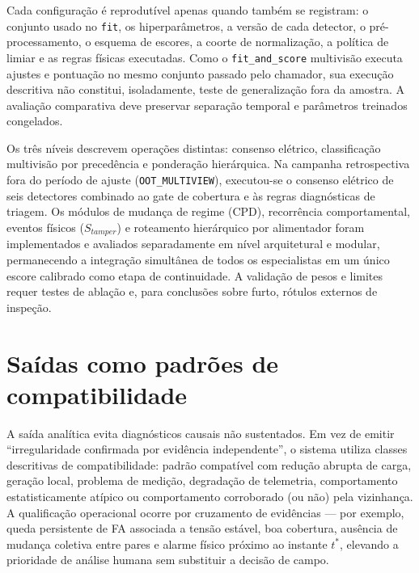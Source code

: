 Cada configuração é reprodutível apenas quando também se registram: o conjunto usado no \texttt{fit}, os hiperparâmetros, a versão de cada detector, o pré-processamento, o esquema de escores, a coorte de normalização, a política de limiar e as regras físicas executadas. Como o \texttt{fit\_and\_score} multivisão executa ajustes e pontuação no mesmo conjunto passado pelo chamador, sua execução descritiva não constitui, isoladamente, teste de generalização fora da amostra. A avaliação comparativa deve preservar separação temporal e parâmetros treinados congelados.

Os três níveis descrevem operações distintas: consenso elétrico, classificação multivisão por precedência e ponderação hierárquica. Na campanha retrospectiva fora do período de ajuste (\texttt{OOT\_MULTIVIEW}), executou-se o consenso elétrico de seis detectores combinado ao gate de cobertura e às regras diagnósticas de triagem. Os módulos de mudança de regime (CPD), recorrência comportamental, eventos físicos (\(S_{tamper}\)) e roteamento hierárquico por alimentador foram implementados e avaliados separadamente em nível arquitetural e modular, permanecendo a integração simultânea de todos os especialistas em um único escore calibrado como etapa de continuidade. A validação de pesos e limites requer testes de ablação e, para conclusões sobre furto, rótulos externos de inspeção.

\section{Saídas como padrões de compatibilidade}\label{sauxeddas-como-padruxf5es-de-compatibilidade}

A saída analítica evita diagnósticos causais não sustentados. Em vez de emitir ``irregularidade confirmada por evidência independente'', o sistema utiliza classes descritivas de compatibilidade: padrão compatível com redução abrupta de carga, geração local, problema de medição, degradação de telemetria, comportamento estatisticamente atípico ou comportamento corroborado (ou não) pela vizinhança. A qualificação operacional ocorre por cruzamento de evidências --- por exemplo, queda persistente de FA associada a tensão estável, boa cobertura, ausência de mudança coletiva entre pares e alarme físico próximo ao instante $t^*$, elevando a prioridade de análise humana sem substituir a decisão de campo.



